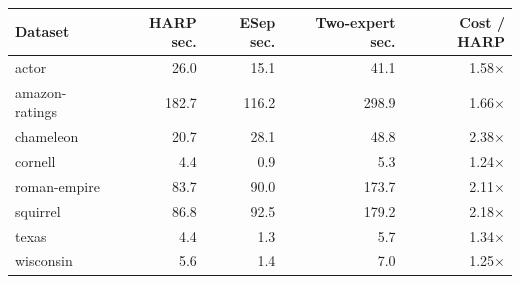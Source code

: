 \begin{tabular}{lrrrr}
\toprule
Dataset & HARP sec. & ESep sec. & Two-expert sec. & Cost / HARP \\
\midrule
actor & 26.0 & 15.1 & 41.1 & 1.58$\times$ \\
amazon-ratings & 182.7 & 116.2 & 298.9 & 1.66$\times$ \\
chameleon & 20.7 & 28.1 & 48.8 & 2.38$\times$ \\
cornell & 4.4 & 0.9 & 5.3 & 1.24$\times$ \\
roman-empire & 83.7 & 90.0 & 173.7 & 2.11$\times$ \\
squirrel & 86.8 & 92.5 & 179.2 & 2.18$\times$ \\
texas & 4.4 & 1.3 & 5.7 & 1.34$\times$ \\
wisconsin & 5.6 & 1.4 & 7.0 & 1.25$\times$ \\
\bottomrule
\end{tabular}
